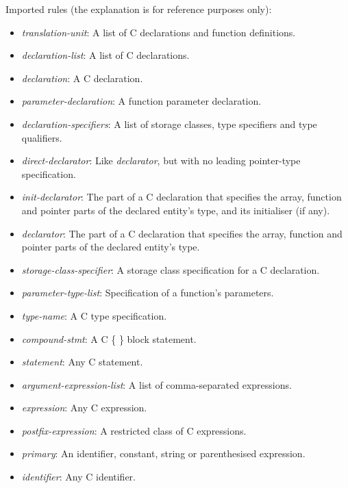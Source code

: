 \documentclass[11pt,letterpaper]{article}
\begin{document}
Imported rules (the explanation is for reference purposes only):
\begin{itemize}
\item \emph{translation-unit}: A list of C declarations and function
definitions.

\item \emph{declaration-list}: A list of C declarations.

\item \emph{declaration}: A C declaration.

\item \emph{parameter-declaration}: A function parameter declaration.

\item \emph{declaration-specifiers}: A list of storage classes, type
specifiers and type qualifiers.

\item \emph{direct-declarator}: Like \emph{declarator}, but with no
leading pointer-type specification.

\item \emph{init-declarator}: The part of a C declaration that specifies
the array, function and pointer parts of the declared entity's type, and
its initialiser (if any).

\item \emph{declarator}: The part of a C declaration that specifies
the array, function and pointer parts of the declared entity's type.

\item \emph{storage-class-specifier}: A storage class specification for
a C declaration.

\item \emph{parameter-type-list}: Specification of a function's parameters.

\item \emph{type-name}: A C type specification.

\item \emph{compound-stmt}: A C \{ \} block statement.

\item \emph{statement}: Any C statement.

\item \emph{argument-expression-list}: A list of comma-separated
expressions.

\item \emph{expression}: Any C expression.

\item \emph{postfix-expression}: A restricted class of C expressions.

\item \emph{primary}: An identifier, constant, string or parenthesised
expression.

\item \emph{identifier}: Any C identifier.
\end{itemize}
\end{document}
